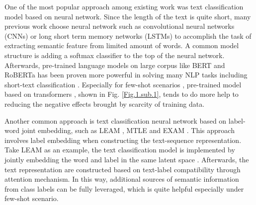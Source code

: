 \documentclass[letterpaper]{article} %
\begin{document}
  One  of  the most popular approach among existing work was text classification
  model  based  on  neural network. Since the length of the text is quite short,
  many   previous   work \cite{wen2016network}  choose  neural  network  such  as
  convolutional                          neural                         networks
  (CNNs) \cite{kim2014convolutional,zhang2015character,conneau2016very}  or  long
  short  term memory networks (LSTMs) \cite{mousa2017contextual,liu2016recurrent}
  to  accomplish  the task of extracting semantic feature from limited amount of
  words.  A  common model structure is adding a softmax classifier to the top of
  the  neural  network.  Afterwards, pre-trained language models on large corpus
  like   BERT \cite{devlin2018bert}  and  RoBERTa \cite{liu2019roberta}  has  been
  proven   more   powerful  in  solving  many  NLP  tasks  including  short-text
  classification \cite{madabushi2020cost}.      Especially      for      few-shot
  scenarios \cite{yu2018diverse},       pre-trained      model      based      on
  transformers \cite{vaswani2017attention},   shown  in  Fig.  \ref{Fig.1.sub.1},
  tends  to do more help to reducing the negative effects brought by scarcity of
  training data.

  Another  common  approach  is  text  classification  neural  network  based on
  label-word     joint     embedding,    such    as    LEAM \cite{wang2018joint},
  MTLE \cite{zhang2017multi}   and   EXAM \cite{du2019explicit}.   This   approach
  involves  label  embedding when constructing the text-sequence representation.
  Take  LEAM  as  an  example,  the  text classification model is implemented by
  jointly    embedding    the    word    and    label   in   the   same   latent
  space \cite{wang2018joint}. Afterwards, the text representation are constructed
  based  on  text-label  compatibility through attention mechanism. In this way,
  additional  sources  of  semantic  information  from class labels can be fully
  leveraged, which is quite helpful especially under few-shot scenario.
\end{document}
